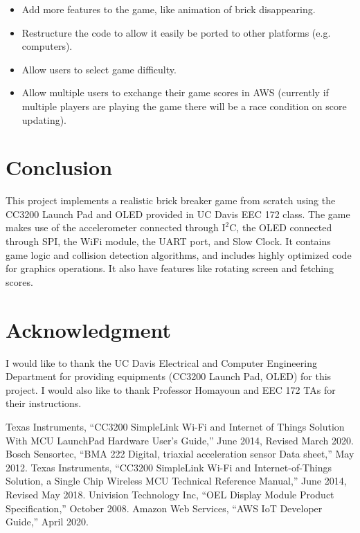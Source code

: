 \documentclass[conference]{IEEEtran}
\begin{document}
\begin{itemize}
\item Add more features to the game, like animation of brick disappearing.
\item Restructure the code to allow it easily be ported to other platforms
	(e.g. computers).
\item Allow users to select game difficulty.
\item Allow multiple users to exchange their game scores in AWS (currently
	if multiple players are playing the game there will be a race condition
	on score updating).
\end{itemize}

\section{Conclusion}
This project implements a realistic brick breaker game from scratch using the
 CC3200 Launch Pad and OLED provided in UC Davis EEC 172 class. The game makes
 use of the accelerometer connected through $\text{I}^\text{2}\text{C}$, the
 OLED connected through SPI, the WiFi module, the UART port, and Slow Clock. It
 contains game logic and collision detection algorithms, and includes highly
 optimized code for graphics operations. It also have features like rotating
 screen and fetching scores.

\section*{Acknowledgment}
I would like to thank the UC Davis Electrical and Computer Engineering
 Department for providing equipments (CC3200 Launch Pad, OLED) for this project.
 I would also like to thank Professor Homayoun and EEC 172 TAs for their
 instructions.

\begin{thebibliography}{00}
 Texas Instruments, ``CC3200 SimpleLink Wi-Fi and Internet of Things Solution With MCU LaunchPad Hardware User's Guide,'' June 2014, Revised March 2020. %
 Bosch Sensortec, ``BMA 222 Digital, triaxial acceleration sensor Data sheet,'' May 2012. %
 Texas Instruments, ``CC3200 SimpleLink Wi-Fi and Internet-of-Things Solution, a Single Chip Wireless MCU Technical Reference Manual,'' June 2014, Revised May 2018. %
 Univision Technology Inc, ``OEL Display Module Product Specification,'' October 2008. %
 Amazon Web Services, ``AWS IoT Developer Guide,'' April 2020.
\end{thebibliography}
\end{document}
